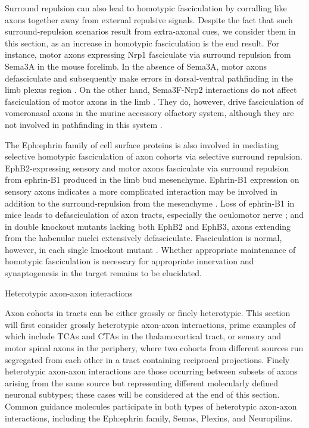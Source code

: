 Surround repulsion can also lead to homotypic fasciculation by corralling like axons together away from external repulsive signals.
Despite the fact that such surround-repulsion scenarios result from extra-axonal cues, we consider them in this section, as an increase in homotypic fasciculation is the end result.
For instance, motor axons expressing Nrp1 fasciculate via surround repulsion from Sema3A in the mouse forelimb.
In the absence of Sema3A, motor axons defasciculate and subsequently make errors in dorsal-ventral pathfinding in the limb plexus region \cite{huber2005distinct}.
On the other hand, Sema3F-Nrp2 interactions do not affect fasciculation of motor axons in the limb \cite{huber2005distinct}.
They do, however, drive fasciculation of vomeronasal axons in the murine accessory olfactory system, although they are not involved in pathfinding in this system \cite{cloutier2002neuropilin}.

The Eph:ephrin family of cell surface proteins is also involved in mediating selective homotypic fasciculation of axon cohorts via selective surround repulsion.
EphB2-expressing sensory and motor axons fasciculate via surround repulsion from ephrin-B1 produced in the limb bud mesenchyme.
Ephrin-B1 expression on sensory axons indicates a more complicated interaction may be involved in addition to the surround-repulsion from the mesenchyme \cite{luxey2013eph}.
Loss of ephrin-B1 in mice leads to defasciculation of axon tracts, especially the oculomotor nerve \cite{davy2004ephrin}; and in double knockout mutants lacking both EphB2 and EphB3, axons extending from the habenular nuclei extensively defasciculate.
Fasciculation is normal, however, in each single knockout mutant \cite{orioli1996sek4}.
Whether appropriate maintenance of homotypic fasciculation is necessary for appropriate innervation and synaptogenesis in the target remains to be elucidated.


Heterotypic axon-axon interactions

Axon cohorts in tracts can be either grossly or finely heterotypic.
This section will first consider grossly heterotypic axon-axon interactions, prime examples of which include TCAs and CTAs in the thalamocortical tract, or sensory and motor spinal axons in the periphery, where two cohorts from different sources run segregated from each other in a tract containing reciprocal projections.
Finely heterotypic axon-axon interactions are those occurring between subsets of axons arising from the same source but representing different molecularly defined neuronal subtypes; these cases will be considered at the end of this section.
Common guidance molecules participate in both types of heterotypic axon-axon interactions, including the Eph:ephrin family, Semas, Plexins, and Neuropilins. 

